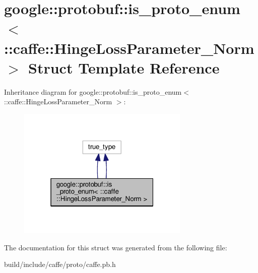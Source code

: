\hypertarget{structgoogle_1_1protobuf_1_1is__proto__enum_3_01_1_1caffe_1_1_hinge_loss_parameter___norm_01_4}{}\section{google\+:\+:protobuf\+:\+:is\+\_\+proto\+\_\+enum$<$ \+:\+:caffe\+:\+:Hinge\+Loss\+Parameter\+\_\+\+Norm $>$ Struct Template Reference}
\label{structgoogle_1_1protobuf_1_1is__proto__enum_3_01_1_1caffe_1_1_hinge_loss_parameter___norm_01_4}


Inheritance diagram for google\+:\+:protobuf\+:\+:is\+\_\+proto\+\_\+enum$<$ \+:\+:caffe\+:\+:Hinge\+Loss\+Parameter\+\_\+\+Norm $>$\+:
\nopagebreak
\begin{figure}[H]
\begin{center}
\leavevmode
\includegraphics[width=232pt]{structgoogle_1_1protobuf_1_1is__proto__enum_3_01_1_1caffe_1_1_hinge_loss_parameter___norm_01_4__inherit__graph}
\end{center}
\end{figure}


The documentation for this struct was generated from the following file\+:\begin{DoxyCompactItemize}
\item 
build/include/caffe/proto/caffe.\+pb.\+h\end{DoxyCompactItemize}
